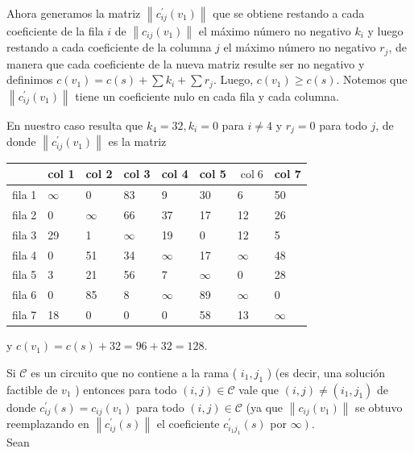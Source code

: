 \documentclass[10pt]{article}
\begin{document}
Ahora generamos la matriz $\left\|c_{i j}^{\prime}\left(v_{1}\right)\right\|$ que se obtiene restando a cada coeficiente de la fila $i$ de $\left\|c_{i j}\left(v_{1}\right)\right\|$ el máximo número no negativo $k_{i}$ y luego restando a cada coeficiente de la columna $j$ el máximo número no negativo $r_{j}$, de manera que cada coeficiente de la nueva matriz resulte ser no negativo y definimos $c\left(v_{1}\right)=c(s)+\sum k_{i}+\sum r_{j}$. Luego, $c\left(v_{1}\right) \geq c(s)$. Notemos que $\left\|c_{i j}^{\prime}\left(v_{1}\right)\right\|$ tiene un coeficiente nulo en cada fila y cada columna.

En nuestro caso resulta que $k_{4}=32, k_{i}=0$ para $i \neq 4$ y $r_{j}=0$ para todo $j$, de donde $\left\|c_{i j}^{\prime}\left(v_{1}\right)\right\|$ es la matriz

\begin{center}
\begin{tabular}{|l|l|l|l|l|l|l|l|}
\hline
 & col 1 & col 2 & col 3 & col 4 & col 5 & $\operatorname{col} 6$ & col 7 \\
\hline
fila 1 & $\infty$ & 0 & 83 & 9 & 30 & 6 & 50 \\
\hline
fila 2 & 0 & $\infty$ & 66 & 37 & 17 & 12 & 26 \\
\hline
fila 3 & 29 & 1 & $\infty$ & 19 & 0 & 12 & 5 \\
\hline
fila 4 & 0 & 51 & 34 & $\infty$ & 17 & $\infty$ & 48 \\
\hline
fila 5 & 3 & 21 & 56 & 7 & $\infty$ & 0 & 28 \\
\hline
fila 6 & 0 & 85 & 8 & $\infty$ & 89 & $\infty$ & 0 \\
\hline
fila 7 & 18 & 0 & 0 & 0 & 58 & 13 & $\infty$ \\
\hline
\end{tabular}
\end{center}

y $c\left(v_{1}\right)=c(s)+32=96+32=128$.

Si $\mathcal{C}$ es un circuito que no contiene a la rama ( $i_{1}, j_{1}$ ) (es decir, una solución factible de $v_{1}$ ) entonces para todo $(i, j) \in \mathcal{C}$ vale que $(i, j) \neq\left(i_{1}, j_{1}\right)$ de donde $c_{i j}^{\prime}(s)=c_{i j}\left(v_{1}\right)$ para todo $(i, j) \in \mathcal{C}$ (ya que $\left\|c_{i j}\left(v_{1}\right)\right\|$ se obtuvo reemplazando en $\left\|c_{i j}^{\prime}(s)\right\|$ el coeficiente $c_{i_{1} j_{1}}^{\prime}(s)$ por $\left.\infty\right)$.\\
Sean
\end{document}
